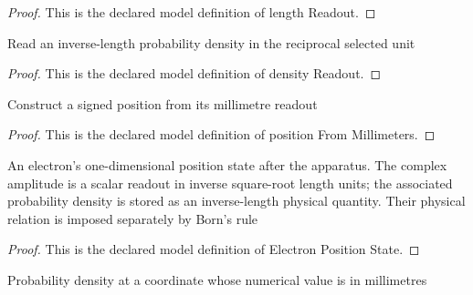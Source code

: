 \begin{proof}
  This is the declared model definition of length Readout.
\end{proof}
\begin{definition}
  \label{def:physics:phyx-mini-0645:phyxminiproblems-problemphyxmini0645-densityreadout}
  Read an inverse-length probability density in the reciprocal selected unit
\end{definition}
\begin{proof}
  This is the declared model definition of density Readout.
\end{proof}
\begin{definition}
  \label{def:physics:phyx-mini-0645:phyxminiproblems-problemphyxmini0645-positionfrommillimeters}
  Construct a signed position from its millimetre readout
\end{definition}
\begin{proof}
  This is the declared model definition of position From Millimeters.
\end{proof}
\begin{definition}
  \label{def:physics:phyx-mini-0645:phyxminiproblems-problemphyxmini0645-electronpositionstate}
  An electron's one-dimensional position state after the apparatus. The complex amplitude is a scalar readout in inverse square-root length units; the associated probability density is stored as an inverse-length physical quantity. Their physical relation is imposed separately by Born's rule
\end{definition}
\begin{proof}
  This is the declared model definition of Electron Position State.
\end{proof}
\begin{definition}
  \label{def:physics:phyx-mini-0645:phyxminiproblems-problemphyxmini0645-densityatmillimetercoordinate}
  Probability density at a coordinate whose numerical value is in millimetres
\end{definition}
